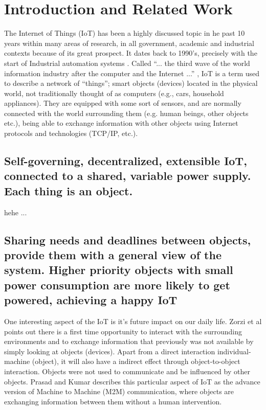 \documentclass[../main/Self-Stabilization.tex]{subfiles}
\begin{document}
\section{Introduction and Related Work}\label{intro}
The Internet of Things (IoT) has been a highly discussed topic in he past 10 years within many areas of research, in all government, academic and industrial contexts because of its great prospect. It dates back to 1990's, precisely with the start of Industrial automation systems \cite{prasad2012energy}. Called ``... the third wave of the world information industry after the computer and the Internet ...'' \cite{IoT6150221}, IoT is a term used to describe a network of ``things''; smart objects (devices) located in the physical world, not traditionally thought of as computers (e.g., cars, household appliances). They are equipped with some sort of sensors, and are normally connected with the world surrounding them (e.g. human beings, other objects etc.), being able to exchange information with other objects using Internet protocols and technologies (TCP/IP, etc.).
\subsection{Self-governing, decentralized, extensible IoT, connected to a shared, variable power supply. Each thing is an object.}

hehe ...

\subsection{Sharing needs and deadlines between objects, provide them with a general view of the system. Higher priority objects with small power consumption are more likely to get powered, achieving a happy IoT}
One interesting aspect of the IoT is it's future impact on our daily life. Zorzi et al \cite{zorzi2010today} points out there is a first time opportunity to interact with the surrounding environments and to exchange information that previously was not available by simply looking at objects (devices). Apart from a direct interaction individual-machine (object), it will also have a indirect effect through object-to-object interaction. Objects were not used to communicate and be influenced by other objects. Prasad and Kumar \cite{prasad2012energy} describes this particular aspect of IoT as the advance version of Machine to Machine (M2M) communication, where objects are exchanging information between them without a human intervention.
\end{document}
